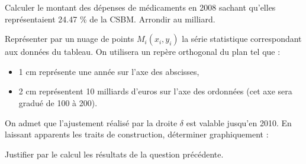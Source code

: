 \begin{questions}
	
	\question[1] Calculer le montant des dépenses de médicaments en 2008 sachant qu'elles représentaient \num{24.47}  \% de la CSBM. Arrondir au milliard.
	
	\question[2] Représenter par un nuage de points $M_i(x_i, y_i)$ la série statistique correspondant aux données du tableau. On utilisera un repère orthogonal du plan tel que :
	\begin{itemize}
		\item 1 cm représente une année sur l'axe des abscisses,
		
		\item 2 cm représentent 10 milliards d'euros sur l'axe des ordonnées (cet axe sera gradué de 100 à 200).
		
	\end{itemize}

	\question[4] 
	
		\question[2] On admet que l'ajustement réalisé par la droite $\delta$ est valable jusqu'en 2010. En laissant apparents les traits de construction, déterminer graphiquement :
		
		\question[3] Justifier par le calcul les résultats de la question précédente.
\end{questions}